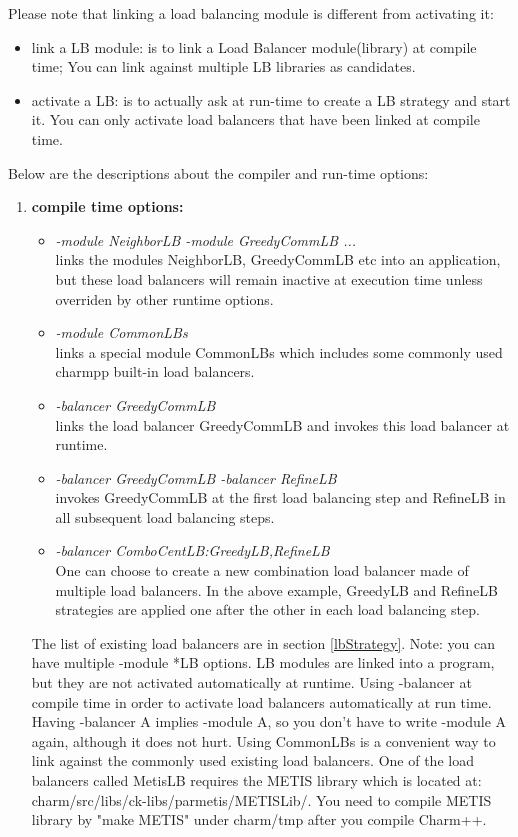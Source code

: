 Please note that linking a load balancing module is different from activating it:
\begin{itemize}
\item link a LB module: is to link a Load Balancer module(library) at 
   compile time; You can link against multiple LB libraries as candidates.
\item activate a LB: is to actually ask at run-time to create a LB strategy and 
   start it. You can only activate load balancers that have been linked at
   compile time.
\end{itemize}


Below are the descriptions about the compiler and run-time options:

\begin{enumerate}
\item {\bf compile time options:}

\begin{itemize}
\item {\em -module NeighborLB -module GreedyCommLB ...}  \\
  links the modules NeighborLB, GreedyCommLB etc into an application, but these
load balancers will remain inactive at execution time unless overriden by other
runtime options.
\item {\em -module CommonLBs} \\
  links a special module CommonLBs which includes some commonly used charmpp{}
built-in load balancers.
\item {\em -balancer GreedyCommLB} \\
  links the load balancer GreedyCommLB and invokes this load balancer at
runtime.
\item {\em -balancer GreedyCommLB -balancer RefineLB} \\
  invokes GreedyCommLB at the first load balancing step and RefineLB in all
subsequent load balancing steps.
\item {\em -balancer ComboCentLB:GreedyLB,RefineLB}  \\
  One can choose to create a new combination load balancer made of multiple
load balancers. In the above example, GreedyLB and RefineLB strategies are
applied one after the other in each load balancing step.
\end{itemize}

The list of existing load balancers are in section \ref{lbStrategy}. Note: you
can have multiple -module *LB options. LB modules are linked into a program,
but they are not activated automatically at runtime.  Using -balancer at
compile time in order to activate load balancers automatically at run time.
Having -balancer A implies -module A, so you don't have to write -module A
again, although it does not hurt.  Using CommonLBs is a convenient way to link
against the commonly used existing load balancers.  One of the load balancers
called MetisLB requires the METIS library which is located at:
charm/src/libs/ck-libs/parmetis/METISLib/.  You need to compile METIS library
by "make METIS" under charm/tmp after you compile Charm++.


\end{enumerate}
